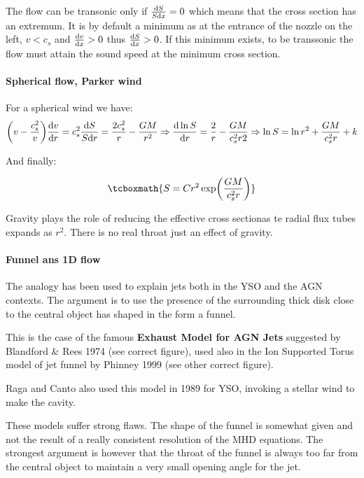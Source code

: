 \documentclass[10pt,a4paper,english,draft]{article}
\let\originalleft\left
\let\originalright\right
\renewcommand{\left}{\mathopen{}\mathclose\bgroup\originalleft}
\renewcommand{\right}{\aftergroup\egroup\originalright}
\begin{document}
The flow can be transonic only if $\frac{\mathrm{d} S}{S\mathrm{d} x} = 0 $ which means that the cross section
has an extremum. It is by default a minimum as at the entrance of the nozzle on the left,  $v<c_s$ and
$\frac{\mathrm{d} v}{\mathrm{d} x} > 0$ thus $\frac{\mathrm{d} S}{\mathrm{d} x} > 0 $. If this minimum exists, to be transsonic the flow must
attain the sound speed at the minimum cross section.

\paragraph{Spherical flow, Parker wind}

For a spherical wind we have:
\begin{equation}
  \left( v - \frac{c_s^2}{v}  \right)\frac{\d v}{\d r} = c_s^2\frac{\d S}{S\d r}
  = \frac{2c_s^2}{r} - \frac{GM}{r^2} \Rightarrow \frac{\d \ln S}{\d r} =
  \frac{2}{r} - \frac{GM}{c_s^2 r2}
  \Rightarrow \ln S = \ln r^2 +\frac{GM}{c_s^2r} + k
\end{equation}

And finally:

\begin{equation}
  \tcboxmath{S = Cr^2 \exp\left(\frac{GM}{c_s^2 r}\right)}
\end{equation}

Gravity plays the role of reducing the effective cross sectionas te radial flux tubes expands
as $r^2$. There is no real throat just an effect of gravity.

\paragraph{Funnel ans 1D flow}
The analogy has been used to explain jets both in the YSO  and the AGN contexts. The argument
is to use the presence of the surrounding thick disk close to the central object has shaped in
the form a funnel.

This is the case of the famous \textbf{ Exhaust Model for AGN Jets} suggested by
Blandford  \&  Rees 1974 (see correct figure), used also in the Ion Supported Torus
model of jet funnel by Phinney 1999 (see other correct figure).


Raga and Canto also used this model in 1989 for YSO, invoking a stellar wind to make
the cavity.


These models suffer strong flaws. The shape of the funnel is somewhat given and
not the result of a really consistent resolution of the MHD equations. The strongest argument
is however that the throat of the funnel is always too far from the central object to maintain
a very small opening angle for the jet.
\end{document}
